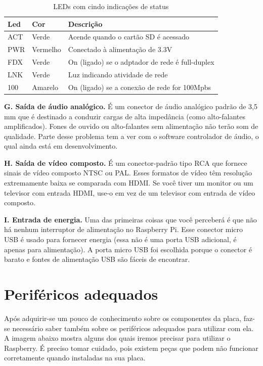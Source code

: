 \newpage

\begin{table}[!htpb]
 \centering
    \begin{tabular}{|l|p{2cm}|l|} 
    \hline
        \textbf{Led} & \textbf{Cor} & \textbf{Descrição} \\
    \hline
        ACT & Verde & Acende quando o cartão SD é acessado \\
    \hline
        PWR & Vermelho & Conectado à alimentação de 3.3V \\
    \hline
        FDX & Verde & On (ligado) se o adptador de rede é full-duplex \\
    \hline
        LNK & Verde & Luz indicando atividade de rede \\
    \hline
        100 & Amarelo & On (ligado) se a conexão de rede for 100Mpbs \\
    \hline
    \end{tabular}
    \caption{LEDs com cindo indicações de status}
    \label{t_fixa}
\end{table}

\textbf{G. Saída de áudio analógico.} É um conector de áudio analógico padrão de 3,5 mm que é destinado a conduzir cargas de alta impedância (como alto-falantes amplificados). Fones de ouvido ou alto-falantes sem alimentação não terão som de qualidade. Parte desse problema tem a ver com o software controlador de áudio, o qual ainda está em desenvolvimento.

\textbf{H. Saída de vídeo composto.} É um conector-padrão tipo RCA que fornece sinais de vídeo composto NTSC ou PAL. Esses formatos de vídeo têm resolução extremamente baixa se comparada com HDMI. Se você tiver um monitor ou um televisor com entrada HDMI, use-o em vez de um televisor com entrada de vídeo composto.

\textbf{I. Entrada de energia.} Uma das primeiras coisas que você perceberá é que não há nenhum interruptor de alimentação no Raspberry Pi. Esse conector micro USB é usado para fornecer energia (essa não é uma porta USB adicional, é apenas para alimentação). A porta micro USB foi escolhida porque o conector é barato e fontes de alimentação USB são fáceis de encontrar.

\section{Periféricos adequados}

Após adquirir-se um pouco de conhecimento sobre os componentes da placa, faz-se necessário saber também sobre os periféricos adequados para utilizar com ela. A imagem abaixo mostra alguns dos quais iremos precisar para utilizar o Raspberry. É preciso tomar cuidado, pois existem peças que podem não funcionar corretamente quando instaladas na sua placa.

